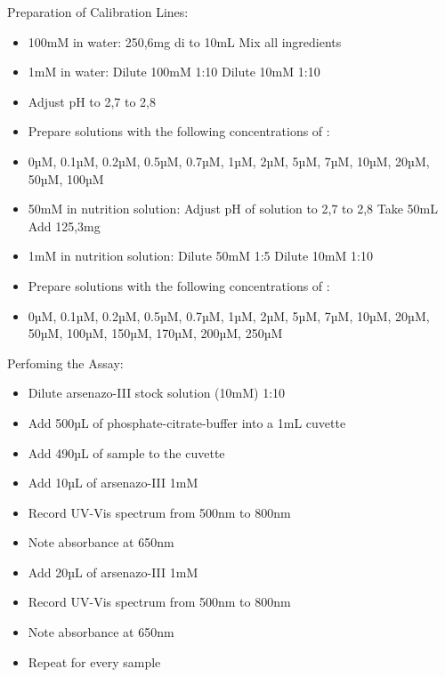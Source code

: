 Preparation of Calibration Lines:
\begin{itemize}
    \item {} 100mM in water:
    \subitem {} 250,6mg
    \subitem di to 10mL
    \subitem Mix all ingredients
    \item {} 1mM in water:
    \subitem Dilute  100mM 1:10
    \subitem Dilute  10mM 1:10
    \item Adjust pH to 2,7 to 2,8
    \item Prepare solutions with the following concentrations of :
    \item 0µM, 0.1µM, 0.2µM, 0.5µM, 0.7µM, 1µM, 2µM, 5µM, 7µM, 10µM, 20µM, 50µM, 100µM
    \item {} 50mM in nutrition solution:
    \subitem Adjust pH of solution to 2,7 to 2,8
    \subitem Take 50mL
    \subitem Add  125,3mg
    \item {} 1mM in nutrition solution:
    \subitem Dilute  50mM 1:5
    \subitem Dilute  10mM 1:10
    \item Prepare solutions with the following concentrations of :
    \item 0µM, 0.1µM, 0.2µM, 0.5µM, 0.7µM, 1µM, 2µM, 5µM, 7µM, 10µM, 20µM, 50µM, 100µM, 150µM, 170µM, 200µM, 250µM
\end{itemize}

Perfoming the Assay:
\begin{itemize}
    \item Dilute arsenazo-III stock solution (10mM) 1:10
    \item Add 500µL of phosphate-citrate-buffer into a 1mL cuvette
    \item Add 490µL of sample to the cuvette
    \item Add 10µL of arsenazo-III 1mM
    \item Record UV-Vis spectrum from 500nm to 800nm
    \item Note absorbance at 650nm
    \item Add 20µL of arsenazo-III 1mM
    \item Record UV-Vis spectrum from 500nm to 800nm
    \item Note absorbance at 650nm
    \item Repeat for every sample
\end{itemize}
